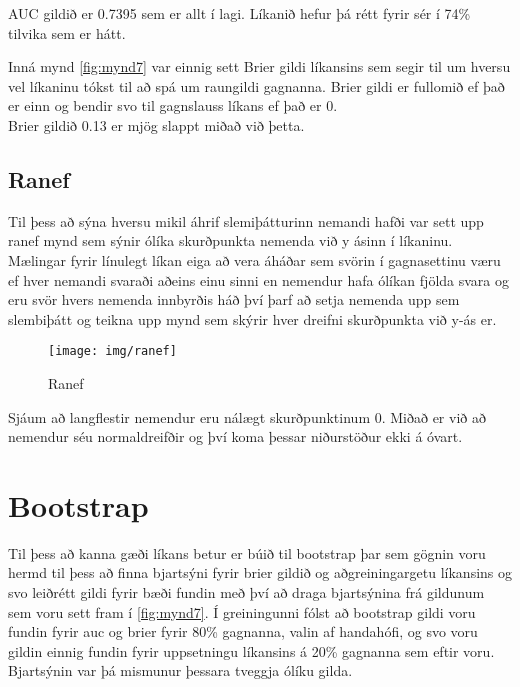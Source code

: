 \documentclass[
  10pt,
]{article}
\begin{document}
AUC gildið er 0.7395 sem er allt í lagi. Líkanið hefur þá rétt fyrir sér í 74\% tilvika sem er hátt.

Inná mynd \ref{fig:mynd7} var einnig sett Brier gildi líkansins sem segir til um hversu vel líkaninu tókst til að spá um raungildi gagnanna. Brier gildi er fullomið ef það er einn og bendir svo til gagnslauss líkans ef það er 0.\\
Brier gildið 0.13 er mjög slappt miðað við þetta.

\newpage

\hypertarget{ranef}{%
\subsection{Ranef}\label{ranef}}

Til þess að sýna hversu mikil áhrif slemiþátturinn nemandi hafði var sett upp ranef mynd sem sýnir ólíka skurðpunkta nemenda við y ásinn í líkaninu. Mælingar fyrir línulegt líkan eiga að vera áháðar sem svörin í gagnasettinu væru ef hver nemandi svaraði aðeins einu sinni en nemendur hafa ólíkan fjölda svara og eru svör hvers nemenda innbyrðis háð því þarf að setja nemenda upp sem slembiþátt og teikna upp mynd sem skýrir hver dreifni skurðpunkta við y-ás er.

\begin{figure}[H]

{\centering \texttt{[image: img/ranef]} 

}

\caption{Ranef}\label{fig:unnamed-chunk-11}
\end{figure}

Sjáum að langflestir nemendur eru nálægt skurðpunktinum 0. Miðað er við að nemendur séu normaldreifðir og því koma þessar niðurstöður ekki á óvart.

\hypertarget{bootstrap}{%
\section{Bootstrap}\label{bootstrap}}

Til þess að kanna gæði líkans betur er búið til bootstrap þar sem gögnin voru hermd til þess að finna bjartsýni fyrir brier gildið og aðgreiningargetu líkansins og svo leiðrétt gildi fyrir bæði fundin með því að draga bjartsýnina frá gildunum sem voru sett fram í \ref{fig:mynd7}. Í greiningunni fólst að bootstrap gildi voru fundin fyrir auc og brier fyrir 80\% gagnanna, valin af handahófi, og svo voru gildin einnig fundin fyrir uppsetningu líkansins á 20\% gagnanna sem eftir voru. Bjartsýnin var þá mismunur þessara tveggja ólíku gilda.
\end{document}
